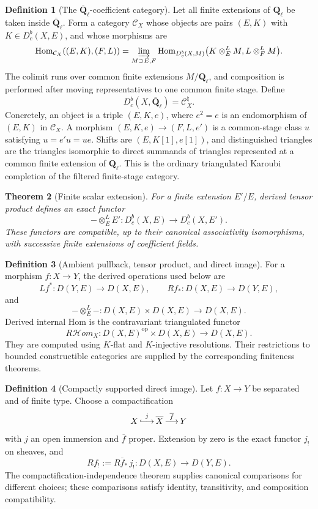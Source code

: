 \documentclass[10pt]{article}
\newtheorem{theorem}{Theorem}[section]
\theoremstyle{definition}
\newtheorem{definition}[theorem]{Definition}
\newcommand{\Ql}{\mathbf Q_\ell}
\newcommand{\Qlb}{\overline{\mathbf Q}_\ell}
\newcommand{\Dbc}{D^b_c}
\begin{document}
\begin{definition}[The \(\Qlb\)-coefficient category]
Let all finite extensions of \(\Ql\) be taken inside \(\Qlb\).  Form a
category \(\mathcal C_X\) whose objects are pairs \((E,K)\) with
\(K\in\Dbc(X,E)\), and whose morphisms are
\[
 \operatorname{Hom}_{\mathcal C_X}((E,K),(F,L))
 =\varinjlim_{M\supset E,F}
 \operatorname{Hom}_{\Dbc(X,M)}
 \bigl(K\otimes_E^LM,L\otimes_F^LM\bigr).
\]
The colimit runs over common finite extensions \(M/\Ql\), and composition
is performed after moving representatives to one common finite stage.
Define
\[
                         \Dbc(X,\Qlb)=\mathcal C_X^{\natural}.
\]
Concretely, an object is a triple \((E,K,e)\), where \(e^2=e\) is an
endomorphism of \((E,K)\) in \(\mathcal C_X\).  A morphism
\((E,K,e)\to(F,L,e')\) is a common-stage class \(u\) satisfying
\(u=e'u=ue\).  Shifts are \((E,K[1],e[1])\), and distinguished triangles
are the triangles isomorphic to direct summands of triangles represented at
a common finite extension of \(\Ql\).  This is the ordinary triangulated
Karoubi completion of the filtered finite-stage category.
\end{definition}

\begin{theorem}[Finite scalar extension]
For a finite extension \(E'/E\), derived tensor product defines an exact
functor
\[
 -\otimes_E^LE':\Dbc(X,E)\longrightarrow\Dbc(X,E').
\]
These functors are compatible, up to their canonical associativity
isomorphisms, with successive finite extensions of coefficient fields.
\end{theorem}

\begin{definition}[Ambient pullback, tensor product, and direct image]
For a morphism \(f:X\to Y\), the derived operations used below are
\[
 Lf^*:D(Y,E)\longrightarrow D(X,E),\qquad
 Rf_*:D(X,E)\longrightarrow D(Y,E),
\]
and
\[
 -\otimes_E^L-:D(X,E)\times D(X,E)\longrightarrow D(X,E).
\]
Derived internal Hom is the contravariant triangulated functor
\[
 R\mathcal Hom_X:
 D(X,E)^{\mathrm{op}}\times D(X,E)\longrightarrow D(X,E).
\]
They are computed using \(K\)-flat and \(K\)-injective resolutions.  Their
restrictions to bounded constructible categories are supplied by the
corresponding finiteness theorems.
\end{definition}

\begin{definition}[Compactly supported direct image]
Let \(f:X\to Y\) be separated and of finite type.  Choose a compactification
\[
             X\mathop{\lhook\joinrel\longrightarrow}^{j}\overline X
              \mathop{\longrightarrow}^{\overline f}Y
\]
with \(j\) an open immersion and \(\overline f\) proper.  Extension by zero
is the exact functor \(j_!\) on sheaves, and
\[
             Rf_!:=R\overline f_*\,j_!:D(X,E)\longrightarrow D(Y,E).
\]
The compactification-independence theorem supplies canonical comparisons
for different choices; these comparisons satisfy identity, transitivity,
and composition compatibility.
\end{definition}
\end{document}
